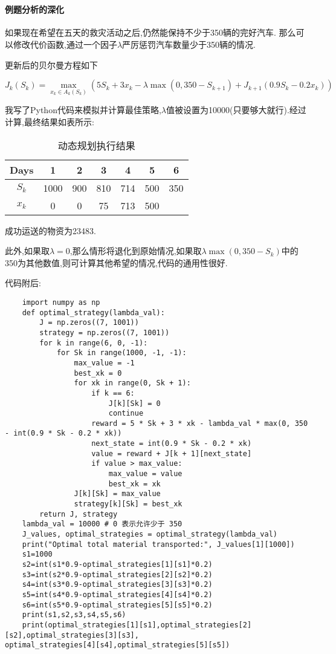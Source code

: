 \documentclass[a4paper]{article}
\begin{document}
\courseheader
{}
~
\paragraph{例题分析的深化}
如果现在希望在五天的救灾活动之后,仍然能保持不少于350辆的完好汽车.
那么可以修改代价函数,通过一个因子$\lambda$严厉惩罚汽车数量少于350辆的情况.

更新后的贝尔曼方程如下

$$J_k(S_k)=\max_{x_k\in A_k(S_k)}(5S_k+3x_k-\lambda\max(0,350-S_{k+1})+J_{k+1}(0.9S_k-0.2x_k))$$

我写了Python代码来模拟并计算最佳策略,$\lambda$值被设置为10000(只要够大就行).经过计算,最终结果如表所示:

\begin{table}[h]
    \centering
    \caption{动态规划执行结果}
    \begin{tabular}{|c|c|c|c|c|c|c|}
        \hline
        \textbf{Days}  & 1    & 2   & 3   & 4   & 5   & 6   \\ \hline
        \textbf{$S_k$} & 1000 & 900 & 810 & 714 & 500 & 350 \\ \hline
        \textbf{$x_k$} & 0    & 0   & 75  & 713 & 500 &     \\ \hline
    \end{tabular}
\end{table}

成功运送的物资为23483.

此外,如果取$\lambda=0$,那么情形将退化到原始情况,如果取$\lambda\max(0,350-S_k)$中的350为其他数值,则可计算其他希望的情况,代码的通用性很好.

代码附后:

\newpage
\begin{lstlisting}
    import numpy as np
    def optimal_strategy(lambda_val):
        J = np.zeros((7, 1001))
        strategy = np.zeros((7, 1001))
        for k in range(6, 0, -1):
            for Sk in range(1000, -1, -1):
                max_value = -1
                best_xk = 0
                for xk in range(0, Sk + 1):
                    if k == 6:
                        J[k][Sk] = 0
                        continue
                    reward = 5 * Sk + 3 * xk - lambda_val * max(0, 350 - int(0.9 * Sk - 0.2 * xk))
                    next_state = int(0.9 * Sk - 0.2 * xk)
                    value = reward + J[k + 1][next_state]
                    if value > max_value:
                        max_value = value
                        best_xk = xk
                J[k][Sk] = max_value
                strategy[k][Sk] = best_xk
        return J, strategy
    lambda_val = 10000 # 0 表示允许少于 350
    J_values, optimal_strategies = optimal_strategy(lambda_val)
    print("Optimal total material transported:", J_values[1][1000])
    s1=1000
    s2=int(s1*0.9-optimal_strategies[1][s1]*0.2)
    s3=int(s2*0.9-optimal_strategies[2][s2]*0.2)
    s4=int(s3*0.9-optimal_strategies[3][s3]*0.2)
    s5=int(s4*0.9-optimal_strategies[4][s4]*0.2)
    s6=int(s5*0.9-optimal_strategies[5][s5]*0.2)
    print(s1,s2,s3,s4,s5,s6)
    print(optimal_strategies[1][s1],optimal_strategies[2][s2],optimal_strategies[3][s3],
optimal_strategies[4][s4],optimal_strategies[5][s5])
\end{lstlisting}
\end{document}
